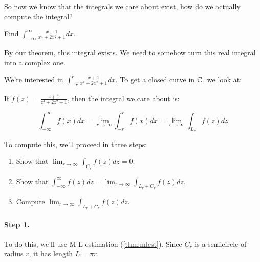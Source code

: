 So now we know that the integrals we care about exist, how do we actually compute the integral?

\begin{ex}{}{} Find $\int_{-\infty}^\infty \frac{x + 1}{x^4+ 2x^2 + 1}dx$.

By our theorem, this integral exists. We need to somehow turn this real integral into a complex one.

We're interested in $\int_{-r}^r \frac{x+1}{x^4 + 2x^2 + 1}dx$. To get a closed curve in $\mathbb{C}$, we look at:

\begin{center}
\end{center}

If $f(z) = \frac{z+1}{z^4 + 2z^2 + 1}$, then the integral we care about is:

$$\int_{-\infty}^\infty f(x)dx = \lim_{r\rightarrow \infty} \int_{-r}^r f(x)dx = \lim_{r\rightarrow \infty} \int_{L_r}f(z)dz$$

To compute this, we'll proceed in three steps:

\begin{enumerate}
\item Show that $\lim_{r\rightarrow \infty} \int_{C_r} f(z)dz = 0$.
\item Show that $\int_{-\infty}^\infty f(z)dz = \lim_{r\rightarrow \infty} \int_{L_r + C_r} f(z)dz$.
\item Compute $\lim_{r\rightarrow \infty} \int_{L_r + C_r} f(z)dz$.
\end{enumerate}

\paragraph{Step 1.} To do this, we'll use M-L estimation (\ref{thm:mlest}). Since $C_r$ is a semicircle of radius $r$, it has length $L = \pi r$.


\end{ex}
